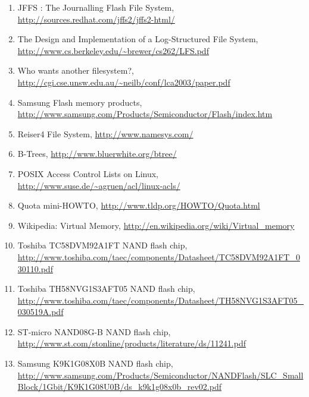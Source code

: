 %
%
%
%

\begin{enumerate}

\item \raggedright \label{ref_JFFSdwmw2}
JFFS : The Journalling Flash File System,
\url{http://sources.redhat.com/jffs2/jffs2-html/}

\item \raggedright \label{ref_LFS}
The Design and Implementation of a Log-Structured File System,
\url{http://www.cs.berkeley.edu/~brewer/cs262/LFS.pdf}

\item \raggedright \label{ref_LaFS}
Who wants another filesystem?,
\url{http://cgi.cse.unsw.edu.au/~neilb/conf/lca2003/paper.pdf}

\item \raggedright \label{ref_SamsungNANDlist} 
Samsung Flash memory products,
\url{http://www.samsung.com/Products/Semiconductor/Flash/index.htm}

\item \raggedright \label{ref_Reiser4}
Reiser4 File System,
\url{http://www.namesys.com/}

\item \raggedright \label{ref_BTrees}
B-Trees,
\url{http://www.bluerwhite.org/btree/}

\item \raggedright \label{ref_ACL}
POSIX Access Control Lists on Linux,
\url{http://www.suse.de/~agruen/acl/linux-acls/}

\item \raggedright \label{ref_Quota}
Quota mini-HOWTO,
\url{http://www.tldp.org/HOWTO/Quota.html}

\item \raggedright \label{ref_VM}
Wikipedia: Virtual Memory,
\url{http://en.wikipedia.org/wiki/Virtual_memory}

\item \raggedright \label{ref_TOSHIBA_TC58DVM92A1FT}
Toshiba TC58DVM92A1FT NAND flash chip,
\url{http://www.toshiba.com/taec/components/Datasheet/TC58DVM92A1FT_030110.pdf}

\item \raggedright \label{ref_TOSHIBA_TH58NVG1S3AFT05}
Toshiba TH58NVG1S3AFT05 NAND flash chip,
\url{http://www.toshiba.com/taec/components/Datasheet/TH58NVG1S3AFT05_030519A.pdf}

\item \raggedright \label{ref_STMICRO_NAND08GB}
ST-micro NAND08G-B NAND flash chip,
\url{http://www.st.com/stonline/products/literature/ds/11241.pdf}

\item \raggedright \label{ref_SMSUNG_K9K1G08X0B}
Samsung K9K1G08X0B NAND flash chip,
\url{http://www.samsung.com/Products/Semiconductor/NANDFlash/SLC_SmallBlock/1Gbit/K9K1G08U0B/ds_k9k1g08x0b_rev02.pdf}

\end{enumerate}


